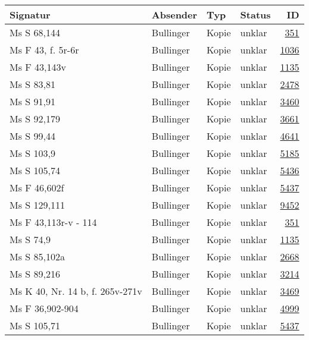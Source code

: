 \documentclass[10pt,a4paper,landscape]{report}
\begin{document}
\begin{longtable}{p{16cm}p{4cm}llr}
\toprule
Signatur & Absender & Typ & Status & ID\\
\midrule
Ms S 68,144	&	Bullinger	&	Kopie	&	unklar	&	\href{http://130.60.24.72/assignment/351}{351}\\
Ms F 43, f. 5r-6r	&	Bullinger	&	Kopie	&	unklar	&	\href{http://130.60.24.72/assignment/1036}{1036}\\
Ms F 43,143v	&	Bullinger	&	Kopie	&	unklar	&	\href{http://130.60.24.72/assignment/1135}{1135}\\
Ms S 83,81	&	Bullinger	&	Kopie	&	unklar	&	\href{http://130.60.24.72/assignment/2478}{2478}\\
Ms S 91,91	&	Bullinger	&	Kopie	&	unklar	&	\href{http://130.60.24.72/assignment/3460}{3460}\\
Ms S 92,179	&	Bullinger	&	Kopie	&	unklar	&	\href{http://130.60.24.72/assignment/3661}{3661}\\
Ms S 99,44	&	Bullinger	&	Kopie	&	unklar	&	\href{http://130.60.24.72/assignment/4641}{4641}\\
Ms S 103,9	&	Bullinger	&	Kopie	&	unklar	&	\href{http://130.60.24.72/assignment/5185}{5185}\\
Ms S 105,74	&	Bullinger	&	Kopie	&	unklar	&	\href{http://130.60.24.72/assignment/5436}{5436}\\
Ms F 46,602f	&	Bullinger	&	Kopie	&	unklar	&	\href{http://130.60.24.72/assignment/5437}{5437}\\
Ms S 129,111	&	Bullinger	&	Kopie	&	unklar	&	\href{http://130.60.24.72/assignment/9452}{9452}\\
Ms F 43,113r-v - 114	&	Bullinger	&	Kopie	&	unklar	&	\href{http://130.60.24.72/assignment/351}{351}\\
Ms S 74,9	&	Bullinger	&	Kopie	&	unklar	&	\href{http://130.60.24.72/assignment/1135}{1135}\\
Ms S 85,102a	&	Bullinger	&	Kopie	&	unklar	&	\href{http://130.60.24.72/assignment/2668}{2668}\\
Ms S 89,216	&	Bullinger	&	Kopie	&	unklar	&	\href{http://130.60.24.72/assignment/3214}{3214}\\
Ms K 40, Nr. 14 b, f. 265v-271v	&	Bullinger	&	Kopie	&	unklar	&	\href{http://130.60.24.72/assignment/3469}{3469}\\
Ms F 36,902-904	&	Bullinger	&	Kopie	&	unklar	&	\href{http://130.60.24.72/assignment/4999}{4999}\\
Ms S 105,71	&	Bullinger	&	Kopie	&	unklar	&	\href{http://130.60.24.72/assignment/5437}{5437}\\

\end{longtable}
\end{document}
